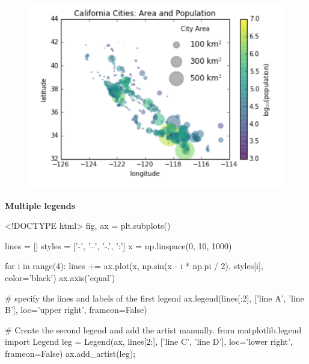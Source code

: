\documentclass[]{book}
\newenvironment{Shaded}{\begin{snugshade}}{\end{snugshade}}
\newcommand{\DataTypeTok}[1]{\textcolor[rgb]{0.13,0.29,0.53}{#1}}
\newcommand{\NormalTok}[1]{#1}
\begin{document}
\begin{figure}
\centering
\includegraphics{images/legend4.png}
\caption{}
\end{figure}

\textbf{Multiple legends}

\begin{Shaded}
\begin{Highlighting}[]
\DataTypeTok{<!DOCTYPE }\NormalTok{html}\DataTypeTok{>}
\NormalTok{fig, ax = plt.subplots()}

\NormalTok{lines = []}
\NormalTok{styles = ['-', '--', '-.', ':']}
\NormalTok{x = np.linspace(0, 10, 1000)}

\NormalTok{for i in range(4):}
\NormalTok{    lines += ax.plot(x, np.sin(x - i * np.pi / 2),}
\NormalTok{                     styles[i], color='black')}
\NormalTok{ax.axis('equal')}

\NormalTok{# specify the lines and labels of the first legend}
\NormalTok{ax.legend(lines[:2], ['line A', 'line B'],}
\NormalTok{          loc='upper right', frameon=False)}

\NormalTok{# Create the second legend and add the artist manually.}
\NormalTok{from matplotlib.legend import Legend}
\NormalTok{leg = Legend(ax, lines[2:], ['line C', 'line D'],}
\NormalTok{             loc='lower right', frameon=False)}
\NormalTok{ax.add_artist(leg);}
\end{Highlighting}
\end{Shaded}
\end{document}
